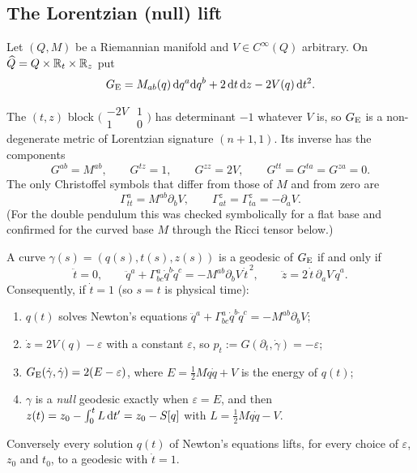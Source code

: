 \subsection{The Lorentzian (null) lift}

\begin{definition}\label{def:hz-eis}
Let $(Q,M)$ be a Riemannian manifold and $V\in C^\infty(Q)$ arbitrary. On
$\widehat Q=Q\times\mathbb{R}_t\times\mathbb{R}_z$ put
\begin{equation}\label{eq:hz-eis-metric}
  G_{\rm E}=M_{ab}(q)\,\mathrm{d} q^a\mathrm{d} q^b+2\,\mathrm{d} t\,\mathrm{d} z-2V(q)\,\mathrm{d} t^2 .
\end{equation}
\end{definition}

The $(t,z)$ block $\bigl(\begin{smallmatrix}-2V&1\\1&0\end{smallmatrix}\bigr)$
has determinant $-1$ whatever $V$ is, so $G_{\rm E}$ is a non-degenerate metric
of Lorentzian signature $(n{+}1,1)$. Its inverse has the components
\begin{equation}\label{eq:hz-eis-inverse}
  G^{ab}=M^{ab},\qquad G^{tz}=1,\qquad G^{zz}=2V,\qquad G^{tt}=G^{ta}=G^{za}=0 .
\end{equation}
The only Christoffel symbols that differ from those of $M$ and from zero are
\begin{equation}\label{eq:hz-eis-christoffel}
  \Gamma^a_{tt}=M^{ab}\partial_bV,\qquad
  \Gamma^z_{at}=\Gamma^z_{ta}=-\partial_aV .
\end{equation}
(For the double pendulum this was checked symbolically for a flat base and
confirmed for the curved base $M$ through the Ricci tensor below.)

\begin{theorem}[Eisenhart]\label{thm:hz-eis}
A curve $\gamma(s)=(q(s),t(s),z(s))$ is a geodesic of $G_{\rm E}$ if and only if
\begin{equation}\label{eq:hz-eis-geod}
  \ddot t=0,\qquad
  \ddot q^a+\Gamma^a_{bc}\dot q^b\dot q^c=-M^{ab}\partial_bV\,\dot t^{\,2},\qquad
  \ddot z=2\,\dot t\,\partial_aV\,\dot q^a .
\end{equation}
Consequently, if $\dot t=1$ (so $s=t$ is physical time):
\begin{enumerate}[label=(\alph*),nosep]
  \item $q(t)$ solves Newton's equations $\ddot q^a+\Gamma^a_{bc}\dot q^b\dot q^c=-M^{ab}\partial_bV$;
  \item $\dot z=2V(q)-\varepsilon$ with a constant $\varepsilon$, so $p_t:=G(\partial_t,\dot\gamma)=-\varepsilon$;
  \item $G_{\rm E}(\dot\gamma,\dot\gamma)=2(E-\varepsilon)$, where $E=\tfrac12M\dot q\dot q+V$ is the energy of $q(t)$;
  \item $\gamma$ is a \emph{null} geodesic exactly when $\varepsilon=E$, and then
        $z(t)=z_0-\int_0^t L\,\mathrm{d} t'=z_0-S[q]$ with $L=\tfrac12M\dot q\dot q-V$.
\end{enumerate}
Conversely every solution $q(t)$ of Newton's equations lifts, for every
choice of $\varepsilon$, $z_0$ and $t_0$, to a geodesic with $\dot t=1$.
\end{theorem}

